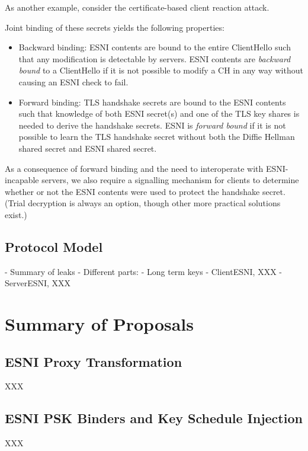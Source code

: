 \documentclass[twoside]{article}
\theoremstyle{definition}
\begin{document}
As another example, consider the certificate-based client reaction attack. 

Joint binding of these secrets yields the following properties:
%
\begin{itemize}
  \item Backward binding: ESNI contents are bound to the entire ClientHello such that any modification
  is detectable by servers. ESNI contents are \emph{backward bound} to a ClientHello if it is not possible 
  to modify a CH in any way without causing an ESNI check to fail.
  \item Forward binding: TLS handshake secrets are bound to the ESNI contents such that knowledge of both
  ESNI secret(s) and one of the TLS key shares is needed to derive the handshake secrets. ESNI is \emph{forward
  bound} if it is not possible to learn the TLS handshake secret without both the Diffie Hellman shared secret and 
  ESNI shared secret.
\end{itemize}
%
As a consequence of forward binding and the need to interoperate with ESNI-incapable servers, we also require 
a signalling mechanism for clients to determine whether or not the ESNI contents were used to protect the 
handshake secret. (Trial decryption is always an option, though other more practical solutions exist.)


\subsection{Protocol Model}

- Summary of leaks
- Different parts:
    - Long term keys
    - ClientESNI, XXX
    - ServerESNI, XXX

\section{Summary of Proposals}

\subsection{ESNI Proxy Transformation}
XXX

\subsection{ESNI PSK Binders and Key Schedule Injection}
XXX



\end{document}
